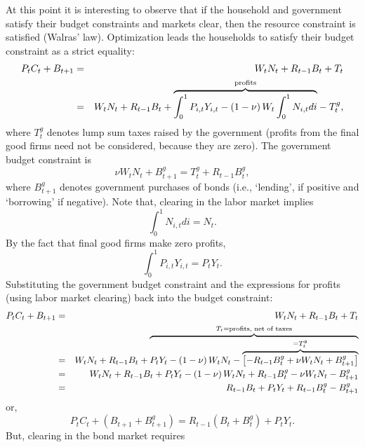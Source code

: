 \documentclass[12pt,thmsa]{article}
\begin{document}
At this point it is interesting to observe that if the household and
government satisfy their budget constraints and markets clear, then the
resource constraint is satisfied (Walras' law). Optimization leads the
households to satisfy their budget constraint as a strict equality:%
\begin{eqnarray*}
P_{t}C_{t}+B_{t+1} &=&W_{t}N_{t}+R_{t-1}B_{t}+T_{t} \\
&=&W_{t}N_{t}+R_{t-1}B_{t}+\overset{\text{profits}}{\overbrace{%
\int_{0}^{1}P_{i,t}Y_{i,t}-\left( 1-\nu \right) W_{t}\int_{0}^{1}N_{i,t}di}}%
-T_{t}^{g},
\end{eqnarray*}%
where $T_{t}^{g}$ denotes lump sum taxes raised by the government (profits
from the final good firms need not be considered, because they are zero).
The government budget constraint is 
\begin{equation*}
\nu W_{t}N_{t}+B_{t+1}^{g}=T_{t}^{g}+R_{t-1}B_{t}^{g},
\end{equation*}%
where $B_{t+1}^{g}$ denotes government purchases of bonds (i.e., `lending',
if positive and `borrowing' if negative). Note that, clearing in the labor
market implies%
\begin{equation*}
\int_{0}^{1}N_{i,t}di=N_{t}.
\end{equation*}%
By the fact that final good firms make zero profits, 
\begin{equation*}
\int_{0}^{1}P_{i,t}Y_{i,t}=P_{t}Y_{t}.
\end{equation*}%
Substituting the government budget constraint and the expressions for
profits (using labor market clearing) back into the budget constraint:%
\begin{eqnarray*}
P_{t}C_{t}+B_{t+1} &=&W_{t}N_{t}+R_{t-1}B_{t}+T_{t} \\
&=&W_{t}N_{t}+R_{t-1}B_{t}+\overset{T_{t}=\text{profits, net of taxes}}{%
\overbrace{P_{t}Y_{t}-\left( 1-\nu \right) W_{t}N_{t}-\overset{=T_{t}^{g}}{%
\overbrace{\left[ -R_{t-1}B_{t}^{g}+\nu W_{t}N_{t}+B_{t+1}^{g}\right] }}}} \\
&=&W_{t}N_{t}+R_{t-1}B_{t}+P_{t}Y_{t}-\left( 1-\nu \right)
W_{t}N_{t}+R_{t-1}B_{t}^{g}-\nu W_{t}N_{t}-B_{t+1}^{g} \\
&=&R_{t-1}B_{t}+P_{t}Y_{t}+R_{t-1}B_{t}^{g}-B_{t+1}^{g}
\end{eqnarray*}%
or,%
\begin{equation*}
P_{t}C_{t}+\left( B_{t+1}+B_{t+1}^{g}\right) =R_{t-1}\left(
B_{t}+B_{t}^{g}\right) +P_{t}Y_{t}.
\end{equation*}%
But, clearing in the bond market requires%
\end{document}

